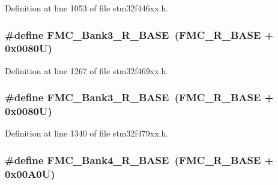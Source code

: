 Definition at line 1053 of file stm32f446xx.\+h.

\subsubsection[{\texorpdfstring{F\+M\+C\+\_\+\+Bank3\+\_\+\+R\+\_\+\+B\+A\+SE}{FMC_Bank3_R_BASE}}]{\setlength{\rightskip}{0pt plus 5cm}\#define F\+M\+C\+\_\+\+Bank3\+\_\+\+R\+\_\+\+B\+A\+SE~({\bf F\+M\+C\+\_\+\+R\+\_\+\+B\+A\+SE} + 0x0080\+U)}\hypertarget{group___peripheral__memory__map_gaf570671195a13f4bb2a1b8f2bd5305c9}{}\label{group___peripheral__memory__map_gaf570671195a13f4bb2a1b8f2bd5305c9}


Definition at line 1267 of file stm32f469xx.\+h.

\subsubsection[{\texorpdfstring{F\+M\+C\+\_\+\+Bank3\+\_\+\+R\+\_\+\+B\+A\+SE}{FMC_Bank3_R_BASE}}]{\setlength{\rightskip}{0pt plus 5cm}\#define F\+M\+C\+\_\+\+Bank3\+\_\+\+R\+\_\+\+B\+A\+SE~({\bf F\+M\+C\+\_\+\+R\+\_\+\+B\+A\+SE} + 0x0080\+U)}\hypertarget{group___peripheral__memory__map_gaf570671195a13f4bb2a1b8f2bd5305c9}{}\label{group___peripheral__memory__map_gaf570671195a13f4bb2a1b8f2bd5305c9}


Definition at line 1340 of file stm32f479xx.\+h.

\subsubsection[{\texorpdfstring{F\+M\+C\+\_\+\+Bank4\+\_\+\+R\+\_\+\+B\+A\+SE}{FMC_Bank4_R_BASE}}]{\setlength{\rightskip}{0pt plus 5cm}\#define F\+M\+C\+\_\+\+Bank4\+\_\+\+R\+\_\+\+B\+A\+SE~({\bf F\+M\+C\+\_\+\+R\+\_\+\+B\+A\+SE} + 0x00\+A0\+U)}\hypertarget{group___peripheral__memory__map_gadca715802374c00fafb6b4eb3e4d9a91}{}\label{group___peripheral__memory__map_gadca715802374c00fafb6b4eb3e4d9a91}


